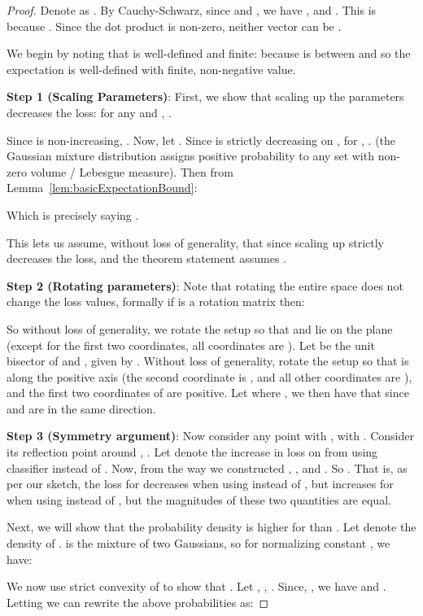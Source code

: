 \documentclass[11pt]{article}
\begin{document}
\begin{proof}
Denote  as .
By Cauchy-Schwarz, since  and , we have , and .
This is because .
Since the dot product is non-zero, neither vector can be .

We begin by noting that  is well-defined and finite: because  is between  and  so the expectation is well-defined with finite, non-negative value.

\textbf{Step 1 (Scaling Parameters)}: First, we show that scaling up the parameters decreases the loss: for any  and , .

Since  is non-increasing, .
Now, let .
Since  is strictly decreasing on , for , .
 (the Gaussian mixture distribution assigns positive probability to any set with non-zero volume / Lebesgue measure).
Then from Lemma~\ref{lem:basicExpectationBound}:

Which is precisely saying .

This lets us assume, without loss of generality, that  since scaling up  strictly decreases the loss, and the theorem statement assumes .

\textbf{Step 2 (Rotating parameters)}: Note that rotating the entire space does not change the loss values, formally if  is a rotation matrix then:

So without loss of generality, we rotate the setup so that  and  lie on the  plane (except for the first two coordinates, all coordinates are ).
Let  be the unit bisector of  and , given by .
Without loss of generality, rotate the setup so that  is along the positive  axis (the second coordinate is , and all other coordinates are ), and the first two coordinates of  are positive. 
Let  where , we then have that  since  and  are in the same direction.

\textbf{Step 3 (Symmetry argument)}: Now consider any point  with , with .
Consider its reflection point around , .
Let  denote the increase in loss on  from using classifier  instead of .
Now, from the way we constructed , , and .
So .
That is, as per our sketch, the loss for  decreases when using  instead of , but increases for  when using  instead of , but the magnitudes of these two quantities are equal.

Next, we will show that the probability density is higher for  than .
Let  denote the density of .
 is the mixture of two Gaussians, so for normalizing constant , we have:



We now use strict convexity of  to show that .
Let , , . Since, , we have  and . Letting  we can rewrite the above probabilities as:



\end{proof}
\end{document}
